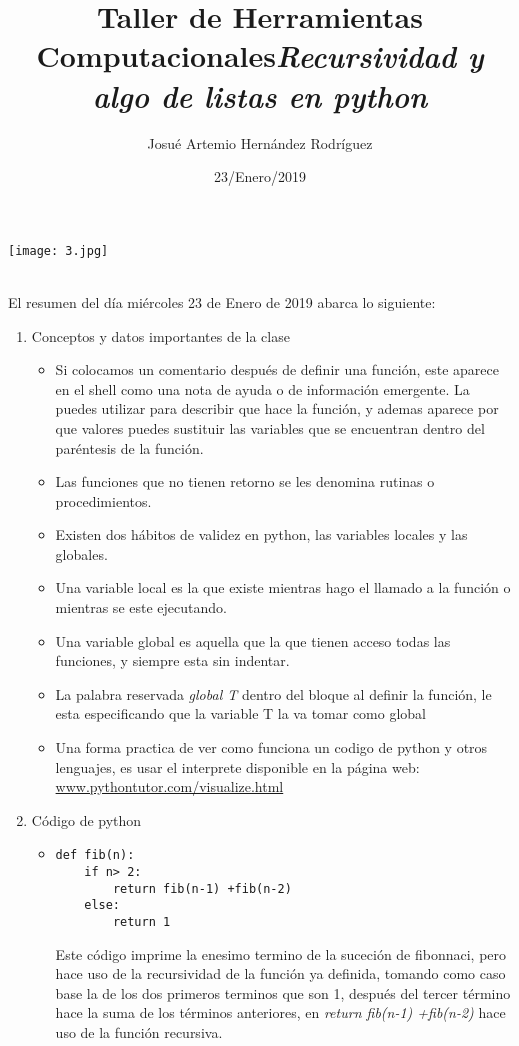 \documentclass[letterpaper, 12pt,oneside]{article}
\title{\Huge Taller de Herramientas Computacionales}
\author{Josué Artemio Hernández Rodríguez}
\date{23/Enero/2019}
\begin{document}
	\maketitle
	\begin{center}
		\texttt{[image: 3.jpg]}
	\end{center}

	\newpage
	
	\title{\huge \textit{Recursividad y algo de listas en python }}\\
	
	El resumen del día miércoles 23 de Enero de 2019 abarca lo siguiente:
	\begin{enumerate}
		\item Conceptos y datos importantes de la clase
			\begin{itemize}
				\item Si colocamos un comentario después de definir una función, este aparece en el shell como una nota de ayuda o de información emergente. La puedes utilizar para describir que hace la función, y ademas aparece por que valores puedes sustituir las variables que se encuentran dentro del paréntesis de la función.
				\item Las funciones que no tienen retorno se les denomina rutinas o procedimientos.
				\item Existen dos hábitos de validez en python, las variables locales y las globales.
				\item Una variable local es la que existe mientras hago el llamado a la función o mientras se este ejecutando.
				\item Una variable global es aquella que la que tienen acceso todas las funciones, y siempre esta sin indentar.
				\item La palabra reservada \textit{global T} dentro del bloque al definir la función, le esta especificando que la variable T la va tomar como global
				\item Una forma practica de ver como funciona un codigo de python y otros lenguajes, es usar el interprete disponible en la página web: \url{www.pythontutor.com/visualize.html}
				
			\end{itemize}
		
		
		
		\item Código de python
			\begin{itemize}
				\item \begin{lstlisting}
def fib(n):
    if n> 2:
        return fib(n-1) +fib(n-2)
    else:
        return 1
				\end{lstlisting} Este código imprime la enesimo termino de la suceción de fibonnaci, pero hace uso de la recursividad de la función ya definida, tomando como caso base la de los dos primeros terminos que son 1, después del tercer término hace la suma de los términos anteriores, en \textit{return fib(n-1) +fib(n-2)} hace uso de la función recursiva.\\
				

\end{itemize}
\end{enumerate}
\end{document}
